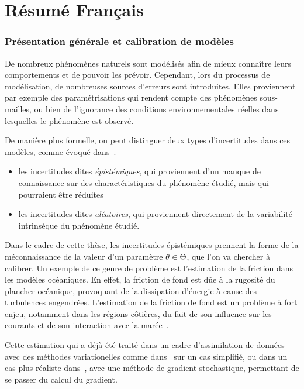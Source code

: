 \documentclass[../../Main_ManuscritThese.tex]{subfiles}
\begin{document}
\chapter*{Résumé Français}
\TitleBtwLines

{}
\label{chap:resume_fr}
\pagestyle{resumeStyle}

\subsection*{Présentation générale et calibration de modèles}
De nombreux phénomènes naturels sont modélisés afin de mieux connaître
leurs comportements et de pouvoir les prévoir.  Cependant, lors du
processus de modélisation, de nombreuses sources d'erreurs sont
introduites. Elles proviennent par exemple des paramétrisations qui
rendent compte des phénomènes sous-mailles, ou bien de l'ignorance des
conditions environnementales réelles dans lesquelles le phénomène est
observé.

De manière plus formelle, on peut distinguer deux types d'incertitudes
dans ces modèles, comme évoqué dans~\cite{walker_defining_2003}.
\begin{itemize}
\item les incertitudes dites \emph{épistémiques}, qui proviennent d'un
  manque de connaissance sur des charactéristiques du phénomène
  étudié, mais qui pourraient être réduites
\item les incertitudes dites \emph{aléatoires}, qui proviennent
  directement de la variabilité intrinsèque du phénomène étudié.
\end{itemize}

Dans le cadre de cette thèse, les incertitudes épistémiques prennent
la forme de la méconnaissance de la valeur d'un paramètre
$\theta \in \Theta$, que l'on va chercher à calibrer.  Un exemple de ce
genre de problème est l'estimation de la friction dans les modèles
océaniques.  En effet, la friction de fond est dûe à la rugosité du
plancher océanique, provoquant de la dissipation d'énergie à cause des
turbulences engendrées. L'estimation de la friction de fond est un
problème à fort enjeu, notamment dans les régions côtières, du fait de
son influence sur les courants et de son interaction avec la
marée~\cite{sinha_principal_1997,boutet_estimation_2015}.

Cette estimation qui a déjà été traité dans un cadre
d'assimilation de données avec des méthodes variationelles comme
dans~\cite{das_estimation_1991,das_variational_1992} sur un cas
simplifié, ou dans un cas plus réaliste
dans~\cite{boutet_estimation_2015}, avec une méthode de gradient
stochastique, permettant de se passer du calcul du gradient.
\end{document}

